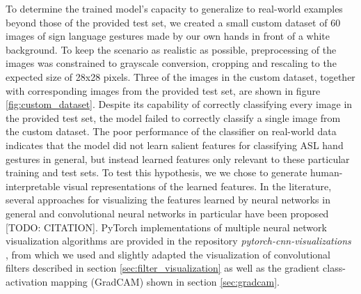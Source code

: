\documentclass[a4paper]{article}
\begin{document}
To determine the trained model's capacity to generalize to real-world examples beyond those of the provided test set, we created a small custom dataset of 60 images of sign language gestures made by our own hands in front of a white background. To keep the scenario as realistic as possible, preprocessing of the images was constrained to grayscale conversion, cropping and rescaling to the expected size of 28x28 pixels. Three of the images in the custom dataset, together with corresponding images from the provided test set, are shown in figure \ref{fig:custom_dataset}. Despite its capability of correctly classifying every image in the provided test set, the model failed to correctly classify a single image from the custom dataset. The poor performance of the classifier on real-world data indicates that the model did not learn salient features for classifying ASL hand gestures in general, but instead learned features only relevant to these particular training and test sets. To test this hypothesis, we we chose to generate human-interpretable visual representations of the learned features. In the literature, several approaches for visualizing the features learned by neural networks in general and convolutional neural networks in particular have been proposed [TODO: CITATION]. PyTorch implementations of multiple neural network visualization algorithms are provided in the repository \textit{pytorch-cnn-visualizations} \cite{Ozbulak2018}, from which we used and slightly adapted the visualization of convolutional filters described in section \ref{sec:filter_visualization} as well as the gradient class-activation mapping (GradCAM) shown in section \ref{sec:gradcam}.
\end{document}
